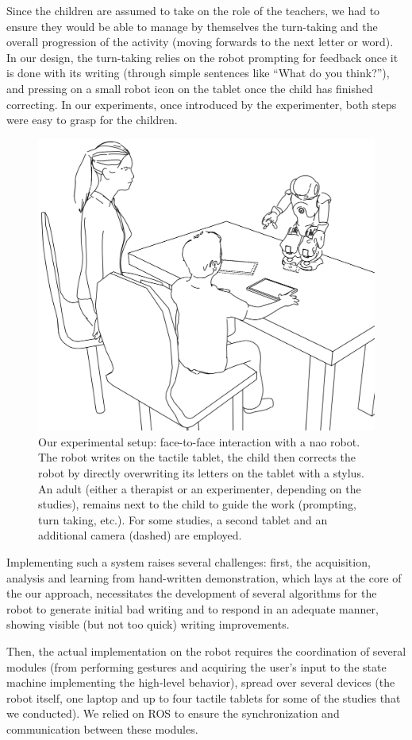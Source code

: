 \documentclass{article}
\begin{document}
Since the children are assumed to take on the role of the teachers, we had to
ensure they would be able to manage by themselves the turn-taking and the
overall progression of the activity (moving forwards to the next letter or
word). In our design, the turn-taking relies on the robot prompting for feedback
once it is done with its writing (through simple sentences like ``What do you
think?''), and pressing on a small robot icon on the tablet once the child has
finished correcting. In our experiments, once introduced by the
experimenter, both steps were easy to grasp for the children.


\begin{figure}
    \centering
    \includegraphics[width=0.6\columnwidth]{experimental_setup}
    \caption{\small Our experimental setup: face-to-face interaction with a {\sc
        nao} robot.  The robot writes on the tactile tablet, the child then
        corrects the robot by directly overwriting its letters on the tablet
        with a stylus. An adult (either a therapist or an experimenter,
        depending on the studies), remains next to the child to guide the work
        (prompting, turn taking, etc.). For some studies, a second tablet and an
        additional camera (dashed) are employed.}

    \label{experimental_setup}
\end{figure}

Implementing such a system raises several challenges: first, the acquisition,
analysis and learning from hand-written demonstration, which lays at the core of
the our approach, necessitates the development of several algorithms for the
robot to generate initial bad writing and to respond in an adequate manner,
showing visible (but not too quick) writing improvements.

Then, the actual implementation on the robot requires the coordination of
several modules (from performing gestures and acquiring the user's input to the
state machine implementing the high-level behavior), spread over several
devices (the robot itself, one laptop and up to four tactile tablets for some of
the studies that we conducted). We relied on ROS to ensure the synchronization
and communication between these modules.
\end{document}
